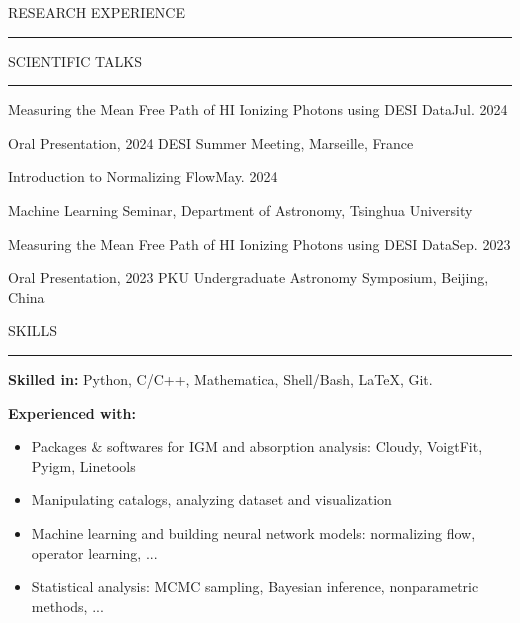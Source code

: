 \documentclass{resume} %
\renewenvironment{rSection}[1]{
\sectionskip
\textcolor{TsinghuaPurple}{\MakeUppercase{#1}}
\sectionlineskip
\hrule
\begin{list}{}{
\setlength{\leftmargin}{0em}
}
\item[]
}{
\end{list}
}
\begin{document}
\begin{rSection}{RESEARCH EXPERIENCE}


\end{rSection}

\newpage

\begin{rSection}{scientific talks}
    \begin{rSubsection}{Measuring the Mean Free Path of HI Ionizing Photons using DESI Data}{Jul. 2024}{}{}
    \item Oral Presentation, 2024 DESI Summer Meeting, Marseille, France
    \end{rSubsection}

    \begin{rSubsection}{Introduction to Normalizing Flow}{May. 2024}{}{}
    \item Machine Learning Seminar, Department of Astronomy, Tsinghua University
    \end{rSubsection}

    \begin{rSubsection}{Measuring the Mean Free Path of HI Ionizing Photons using DESI Data}{Sep. 2023}{}{}
    \item Oral Presentation, 2023 PKU Undergraduate Astronomy Symposium, Beijing, China
    \end{rSubsection}
\end{rSection}


\begin{rSection}{Skills}
    \noindent\textbf{Skilled in:} Python, C/C++, Mathematica, Shell/Bash, \LaTeX, Git.

    \vspace{0.5em}
    
    \noindent\textbf{Experienced with:}
    \begin{itemize}[nosep]
        \item Packages \& softwares for IGM and absorption analysis: Cloudy, VoigtFit, Pyigm, Linetools
        \item Manipulating catalogs, analyzing dataset and visualization
        \item Machine learning and building neural network models: normalizing flow, operator learning, ...
        \item Statistical analysis: MCMC sampling, Bayesian inference, nonparametric methods, ...
    \end{itemize}

\end{rSection}
\end{document}
